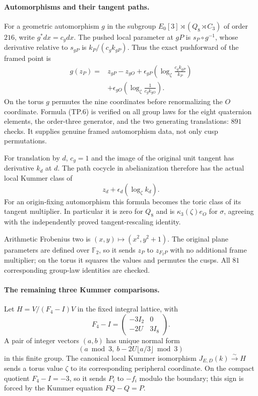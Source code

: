 \paragraph{Automorphisms and their tangent paths.}
For a geometric automorphism $g$ in the subgroup
$E_0[3]\rtimes(Q_8\rtimes C_3)$ of order $216$, write
$g^*dx=c_gdx$.  The pushed local parameter at $gP$
is $s_P\circ g^{-1}$, whose derivative relative to
$s_{gP}$ is $k_P/(c_gk_{gP})$.
Thus the exact pushforward of the framed point is
\[
 \begin{split}
 g(z_P)={}&z_{gP}-z_{gO}
       +\epsilon_{gP}\left(\log_\zeta
                              \frac{c_gk_{gP}}{k_P}\right)\\
       &+\epsilon_{gO}\left(\log_\zeta
                              \frac1{c_gk_{gO}}\right).
 \end{split}                                                   \tag{TP.6}
\]
On the torus $g$ permutes the nine coordinates before
renormalizing the $O$ coordinate.
Formula (TP.6) is verified on all group laws for the
eight quaternion elements, the order-three generator,
and the two generating translations: $891$ checks.
It supplies genuine framed automorphism data, not
only cusp permutations.

For translation by $d$, $c_g=1$ and the image of the
original unit tangent has derivative $k_d$ at $d$.
The path cocycle in abelianization therefore has the
actual local Kummer class of
\[
                         z_d+\epsilon_d(\log_\zeta k_d).
                                                               \tag{TP.7}
\]
For an origin-fixing automorphism this formula becomes
the toric class of its tangent multiplier.  In particular
it is zero for $Q_8$ and is
$\kappa_3(\zeta)e_O$ for $\sigma$, agreeing with
the independently proved tangent-rescaling identity.

Arithmetic Frobenius two is $(x,y)\mapsto(x^2,y^2+1)$.
The original plane parameters are defined over
$\mathbb F_2$, so it sends $z_P$ to $z_{F_2P}$ with
no additional frame multiplier; on the torus it squares
the values and permutes the cusps.
All $81$ corresponding group-law identities are checked.

\paragraph{The remaining three Kummer comparisons.}
Let $H=V/(F_4-I)V$ in the fixed integral lattice, with
\[
           F_4-I=\begin{pmatrix}-3I_2&0\\-2U&3I_8\end{pmatrix}.
                                                               \tag{TP.8}
\]
A pair of integer vectors $(a,b)$ has unique normal form
\[
       (a\bmod3,\ b-2U\lfloor a/3\rfloor\bmod3)
                                                               \tag{TP.9}
\]
in this finite group.
The canonical local Kummer isomorphism
$J_{E,D}(k)\xrightarrow{\sim}H$ sends a torus value
$\zeta$ to its corresponding peripheral coordinate.
On the compact quotient $F_4-I=-3$, so it sends
$P_i$ to $-f_i$ modulo the boundary; this sign is
forced by the Kummer equation $FQ-Q=P$.

